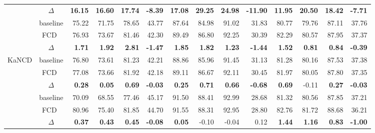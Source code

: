 \documentclass[runningheads]{llncs}
\def\mymethod{FCD}
\newcommand{\redbf}[1]{\textcolor{myred}{\textbf{#1}}} %
\newcommand{\green}[1]{\textcolor{mygreen}{#1}}       %
\begin{document}
\begin{table}[!htpb]
{\begin{tabular}{cc|rrrr|rrrr|rrrr}
                        & $\Delta$ & \redbf{16.15} & \redbf{16.60} & \redbf{17.74} & \redbf{-8.39} & \redbf{17.08} & \redbf{29.25} & \redbf{24.98} & \redbf{-11.90} & \redbf{11.95} & \redbf{20.50} & \redbf{18.42} & \redbf{-7.71} \\
\rowcolor{mybgc} & baseline & 75.22 & 71.75 & 78.65 & 43.77 & 87.64 & 84.98 & 91.02 & 31.83 & 80.77 & 79.76 & 87.11 & 37.76 \\
\rowcolor{mybgc}                      & \mymethod\ & 76.93 & 73.67 & 81.46 & 42.30 & 89.49 & 86.80 & 92.25 & 30.39 & 82.29 & 80.57 & 87.95 & 37.37 \\
\rowcolor{mybgc} \multirow{-3}{*}{NCDM}& $\Delta$& \redbf{1.71} & \redbf{1.92} & \redbf{2.81} & \redbf{-1.47} & \redbf{1.85} & \redbf{1.82} & \redbf{1.23} & \redbf{-1.44} & \redbf{1.52} & \redbf{0.81} & \redbf{0.84} & \redbf{-0.39}  \\
\multirow{3}{*}{KaNCD} & baseline & 76.80 & 73.61 & 81.23 & 42.21 & 88.86 & 85.96 & 91.45 & 31.13 & 81.28 & 80.16 & 87.53 & 37.38 \\
                       & \mymethod\ & 77.08 & 73.66 & 81.92 & 42.18 & 89.11 & 86.67 & 92.11 & 30.45 & 81.97 & 80.05 & 87.80 & 37.35 \\
                       & $\Delta$ & \redbf{0.28} & \redbf{0.05} & \redbf{0.69} & \redbf{-0.03} & \redbf{0.25} & \redbf{0.71} & \redbf{0.66} & \redbf{-0.68} & \redbf{0.69} & \green{-0.11} & \redbf{0.27} & \redbf{-0.03}\\
\rowcolor{mybgc}& baseline & 70.09 & 68.55 & 77.46 & 45.17 & 91.50 & 88.41 & 92.99 & 28.68 & 81.32 & 80.56 & 87.85 & 37.21 \\
\rowcolor{mybgc}                      & \mymethod\ & 80.96 & 75.40 & 81.85 & 44.70 & 91.55 & 88.31 & 92.95 & 28.80 & 82.76 & 81.72 & 88.68 & 36.21 \\
\rowcolor{mybgc}\multirow{-3}{*}{CDND} & $\Delta$ & \redbf{0.37} & \redbf{0.43} & \redbf{0.45} & \redbf{-0.08} & \redbf{0.05} & \green{-0.10} & \green{-0.04} & \green{0.12} & \redbf{1.44} & \redbf{1.16} & \redbf{0.83} & \redbf{-1.00} \\

\end{tabular}}
\end{table}
\end{document}
